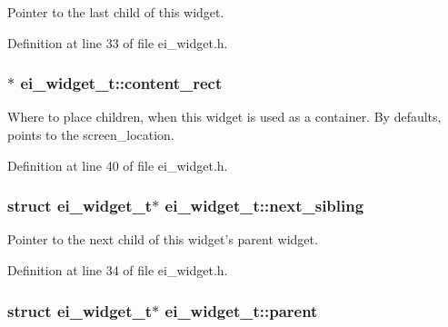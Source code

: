 Pointer to the last child of this widget. 



Definition at line 33 of file ei\-\_\-widget.\-h.

\hypertarget{structei__widget__t_a75c29d388a5f5b32cdd8a9c855bc2a75}{
\subsubsection[{content\-\_\-rect}]{$\ast$ ei\-\_\-widget\-\_\-t\-::content\-\_\-rect}}\label{structei__widget__t_a75c29d388a5f5b32cdd8a9c855bc2a75}


Where to place children, when this widget is used as a container. By defaults, points to the screen\-\_\-location. 



Definition at line 40 of file ei\-\_\-widget.\-h.

\hypertarget{structei__widget__t_ada15cedaf8e6e104a1461c1754ff6cb3}{
\subsubsection[{next\-\_\-sibling}]{\setlength{\rightskip}{0pt plus 5cm}struct {\bf ei\-\_\-widget\-\_\-t}$\ast$ ei\-\_\-widget\-\_\-t\-::next\-\_\-sibling}}\label{structei__widget__t_ada15cedaf8e6e104a1461c1754ff6cb3}


Pointer to the next child of this widget's parent widget. 



Definition at line 34 of file ei\-\_\-widget.\-h.

\hypertarget{structei__widget__t_adb1b43eda89c8e86d6337c939f1a4473}{
\subsubsection[{parent}]{\setlength{\rightskip}{0pt plus 5cm}struct {\bf ei\-\_\-widget\-\_\-t}$\ast$ ei\-\_\-widget\-\_\-t\-::parent}}\label{structei__widget__t_adb1b43eda89c8e86d6337c939f1a4473}


